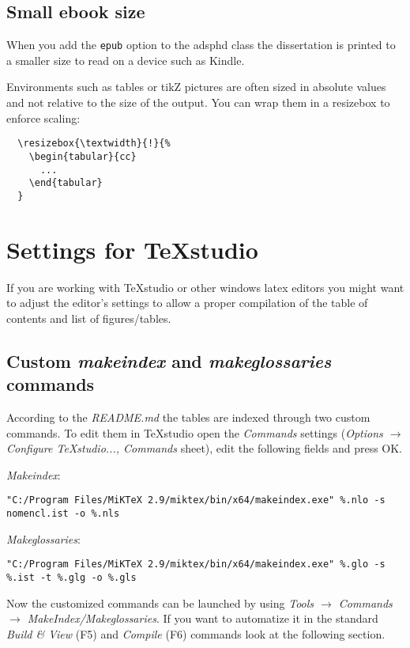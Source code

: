 \subsection{Small ebook size}

When you add the \texttt{epub} option to the adsphd class the dissertation is
printed to a smaller size to read on a device such as Kindle.

Environments such as tables or tikZ pictures are often sized in absolute values
and not relative to the size of the output. You can wrap them in a resizebox
to enforce scaling:

\begin{verbatim}
  \resizebox{\textwidth}{!}{%
    \begin{tabular}{cc}
      ...
    \end{tabular}
  }
\end{verbatim}

\section{Settings for TeXstudio}

If you are working with TeXstudio or other windows latex editors you might want to adjust the editor's settings to allow a proper compilation of the table of contents and list of figures/tables.

\subsection{Custom \textit{makeindex} and \textit{makeglossaries} commands}

According to the \textit{README.md} the tables are indexed through two custom commands. To edit them in TeXstudio open the \textit{Commands} settings (\textit{Options $\to$ Configure TeXstudio...,  Commands} sheet), edit the following fields and press OK.

\textit{Makeindex}:
{\scriptsize
\begin{verbatim}
"C:/Program Files/MiKTeX 2.9/miktex/bin/x64/makeindex.exe" %.nlo -s nomencl.ist -o %.nls
\end{verbatim}}

\textit{Makeglossaries}:
{\scriptsize
\begin{verbatim}
"C:/Program Files/MiKTeX 2.9/miktex/bin/x64/makeindex.exe" %.glo -s %.ist -t %.glg -o %.gls
\end{verbatim}}

Now the customized commands can be launched by using \textit{Tools $\to$ Commands $\to$ MakeIndex/Makeglossaries}. If you want to automatize it in the standard \textit{Build \& View} (F5) and \textit{Compile} (F6) commands look at the following section.

